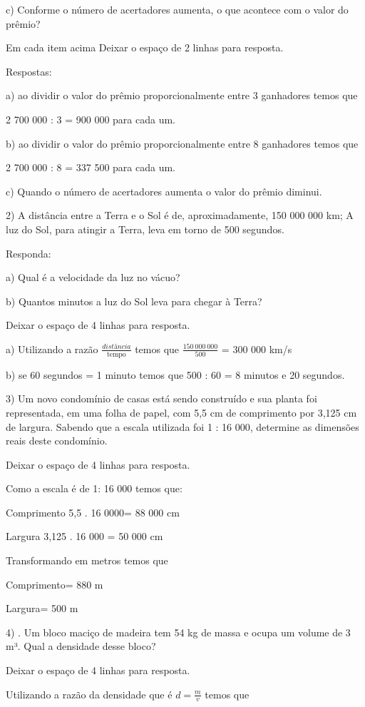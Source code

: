 {c) Conforme o número de acertadores aumenta, o que acontece com o valor
do prêmio?

Em cada item acima Deixar o espaço de 2 linhas para resposta.

Respostas:

a) ao dividir o valor do prêmio proporcionalmente entre 3 ganhadores
temos que

2 700 000 : 3 = 900 000 para cada um.

b) ao dividir o valor do prêmio proporcionalmente entre 8 ganhadores
temos que

2 700 000 : 8 = 337 500 para cada um.

c) Quando o número de acertadores aumenta o valor do prêmio diminui.

2) A distância entre a Terra e o Sol é de, aproximadamente, 150 000 000
km; A luz do Sol, para atingir a Terra, leva em torno de 500 segundos.

Responda:

a) Qual é a velocidade da luz no vácuo?

b) Quantos minutos a luz do Sol leva para chegar à Terra?

Deixar o espaço de 4 linhas para resposta.

a) Utilizando a razão \(\frac{distância}{\text{tempo}}\) temos que
\(\frac{150\ 000\ 000}{500}\) = 300 000 km/s

b) se 60 segundos = 1 minuto temos que 500 : 60 = 8 minutos e 20
segundos.

3) Um novo condomínio de casas está sendo construído e sua planta foi
representada, em uma folha de papel, com 5,5 cm de comprimento por 3,125
cm de largura. Sabendo que a escala utilizada foi 1 : 16 000, determine
as dimensões reais deste condomínio.

Deixar o espaço de 4 linhas para resposta.

Como a escala é de 1: 16 000 temos que:

Comprimento 5,5 . 16 0000= 88 000 cm

Largura 3,125 . 16 000 = 50 000 cm

Transformando em metros temos que

Comprimento= 880 m

Largura= 500 m

4) . Um bloco maciço de madeira tem 54 kg de massa e ocupa um volume de
3 m³. Qual a densidade desse bloco?

Deixar o espaço de 4 linhas para resposta.

Utilizando a razão da densidade que é \(d = \frac{m}{v}\) temos que

}
